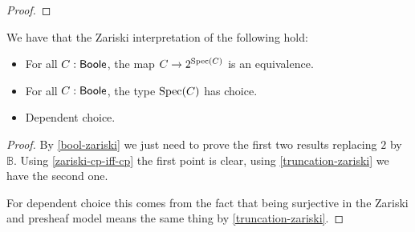 \begin{proof}
\end{proof}

\begin{theorem}
We have that the Zariski interpretation of the following hold:
\begin{itemize}
\item For all $C:\mathsf{Boole}$, the map $C\to {2}^{\operatorname{Spec}(C)}$ is an equivalence.
\item For all $C:\mathsf{Boole}$, the type $\operatorname{Spec}(C)$ has choice.
\item Dependent choice.
\end{itemize}
\end{theorem}

\begin{proof}
By \cref{bool-zariski} we just need to prove the first two results replacing ${2}$ by $\mathbb{B}$. Using \cref{zariski-cp-iff-cp} the first point is clear, using \cref{truncation-zariski} we have the second one.

For dependent choice this comes from the fact that being surjective in the Zariski and presheaf model means the same thing by \cref{truncation-zariski}.
\end{proof}


